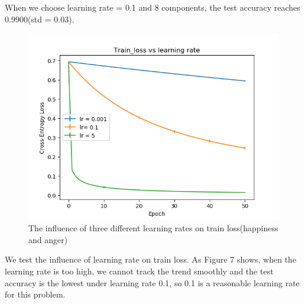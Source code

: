 \documentclass{article} %
\begin{document}
When we choose learning rate = 0.1 and 8 components, the test accuracy reaches 0.9900(std = 0.03).\\
\begin{figure}[h]
	\centering
	\includegraphics[scale=0.5]{./graph/diff_lr.png}
	\caption{The influence of three different learning rates on train loss(happiness and anger)}
\end{figure}
We test the influence of learning rate on train loss. As Figure 7 shows, when the learning rate is too high, we cannot track the trend smoothly and the test accuracy is the lowest under learning rate 0.1, so 0.1 is a reasonable learning rate for this problem.
\end{document}
